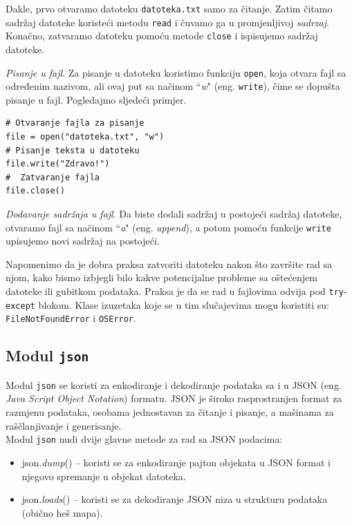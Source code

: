 Dakle, prvo otvaramo datoteku  \texttt{datoteka.txt} samo za čitanje. Zatim čitamo sadržaj datoteke koristeći metodu \texttt{read} i čuvamo ga u promjenljivoj \textit{sadrzaj}. Konačno, zatvaramo datoteku pomoću metode \texttt{close} i ispisujemo sadržaj datoteke. 



\textit{Pisanje u fajl}. Za pisanje u datoteku koristimo funkciju \texttt{open}, koja otvara fajl sa određenim nazivom, ali ovaj put sa načinom ``\textit{w}" (eng. \texttt{write}), čime se dopušta pisanje u fajl. Pogledajmo sljedeći primjer.
\begin{verbatim}
# Otvaranje fajla za pisanje
file = open("datoteka.txt", "w")
# Pisanje teksta u datoteku
file.write("Zdravo!")
#  Zatvaranje fajla 
file.close()
\end{verbatim}


\textit{Dodavanje sadržaja u fajl}. Da biste dodali sadržaj u postojeći sadržaj datoteke, otvaramo fajl sa načinom ``\textit{a}" (eng. \textit{append}), a potom pomoću funkcije \texttt{write} upisujemo novi sadržaj na postojeći. 

Napomenimo da je dobra praksa zatvoriti datoteku nakon što zavr\-šite rad sa njom, kako bismo izbjegli bilo kakve potencijalne probleme sa oštećenjem datoteke ili gubitkom podataka. Praksa je da se rad u fajlovima odvija pod \texttt{try}-\texttt{except} blokom. Klase izuzetaka koje se u tim slučajevima mogu koristiti su: \texttt{FileNotFoundError} i \texttt{OSError}. 


\subsection{Modul \texttt{json}}

Modul \texttt{json} se koristi  za enkodiranje i dekodiranje podataka sa i u JSON (eng. \textit{Java Script Object Notation}) formatu. JSON je  široko raspro\-stranjen format za razmjenu podataka, osobama  jednostavan za čitanje i pisanje, a mašinama za raščlanjivanje i generisanje.\\

Modul \texttt{json} nudi dvije glavne metode za rad sa JSON podacima:


\begin{itemize}
	\item json.\textit{dump}() -- koristi se za enkodiranje pajton objekata u JSON format i njegovo spremanje u objekat  datoteka.
	\item json.\textit{loads}() -- koristi se za dekodiranje JSON niza u strukturu podataka (obično heš mapa).
\end{itemize}

